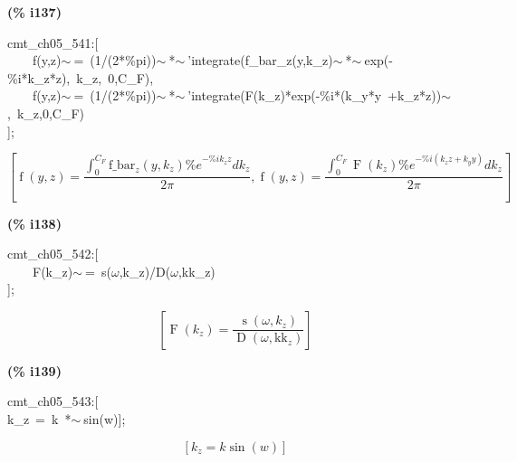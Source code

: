 \documentclass[fleqn]{article}
\begin{document}
\noindent
\begin{minipage}[t]{4.000000em}\color{red}\bfseries
(\% i137)	
\end{minipage}
\begin{minipage}[t]{\textwidth}\color{blue}
cmt\_ch05\_541:[\\
\ \ \ \ f(y,z)\ensuremath{\sim\ }=\ (1/(2*\%pi))\ensuremath{\sim\ }*\ensuremath{\sim\ }'integrate(f\_bar\_z(y,k\_z)\ensuremath{\sim\ }*\ensuremath{\sim\ }exp(-\%i*k\_z*z),\ k\_z,\ 0,C\_F),\\
\ \ \ \ f(y,z)\ensuremath{\sim\ }=\ (1/(2*\%pi))\ensuremath{\sim\ }*\ensuremath{\sim\ }'integrate(F(k\_z)*exp(-\%i*(k\_y*y\ +k\_z*z))\ensuremath{\sim\ },\ k\_z,0,C\_F)\\
];
\end{minipage}
\[\displaystyle \tag{\% o137} 
\operatorname{[}\operatorname{f}\left( y\operatorname{,}z\right) =\frac{\int_{0}^{{C_F}}{\left. {{\ensuremath{\mathrm{f\_ bar}}}_z}\left( y\operatorname{,}{k_z}\right)  {{\% e}^{-\% i {k_z} z}}d{k_z}\right.}}{2 \ensuremath{\pi} }\operatorname{,}\operatorname{f}\left( y\operatorname{,}z\right) =\frac{\int_{0}^{{C_F}}{\left. \operatorname{F}\left( {k_z}\right)  {{\% e}^{-\% i \left( {k_z} z+{k_y} y\right) }}d{k_z}\right.}}{2 \ensuremath{\pi} }\operatorname{]}\mbox{}
\]


\noindent
\begin{minipage}[t]{4.000000em}\color{red}\bfseries
(\% i138)	
\end{minipage}
\begin{minipage}[t]{\textwidth}\color{blue}
cmt\_ch05\_542:[\\
\ \ \ \ F(k\_z)\ensuremath{\sim\ }=\ s(\ensuremath{\omega},k\_z)/D(\ensuremath{\omega},kk\_z)\\
];
\end{minipage}
\[\displaystyle \tag{\% o138} 
\left[ \operatorname{F}\left( {k_z}\right) =\frac{\operatorname{s}\left( \omega \operatorname{,}{k_z}\right) }{\operatorname{D}\left( \omega \operatorname{,}{{\ensuremath{\mathrm{kk}}}_z}\right) }\right] \mbox{}
\]


\noindent
\begin{minipage}[t]{4.000000em}\color{red}\bfseries
(\% i139)	
\end{minipage}
\begin{minipage}[t]{\textwidth}\color{blue}
cmt\_ch05\_543:[\\
k\_z\ =\ k\ *\ensuremath{\sim\ }sin(w)];
\end{minipage}
\[\displaystyle \tag{\% o139} 
\left[ {k_z}=k \sin{(w)}\right] \mbox{}
\]
\end{document}
